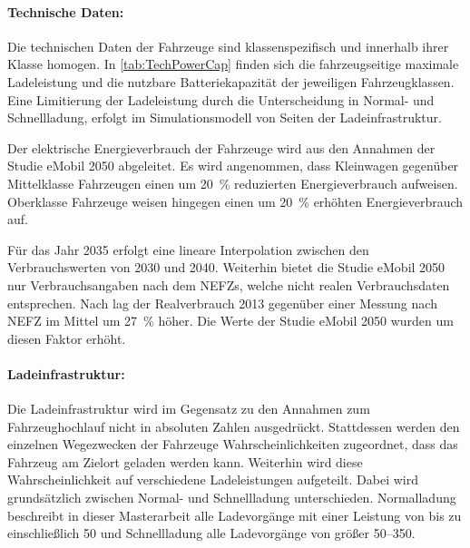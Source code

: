 \paragraph{Technische Daten:}

Die technischen Daten der Fahrzeuge sind klassenspezifisch und innerhalb ihrer Klasse homogen.
In \autoref{tab:TechPowerCap} finden sich die fahrzeugseitige maximale Ladeleistung und die nutzbare Batteriekapazität der jeweiligen Fahrzeugklassen.
Eine Limitierung der Ladeleistung durch die Unterscheidung in Normal- und Schnellladung, erfolgt im Simulationsmodell von Seiten der Ladeinfrastruktur.



Der elektrische Energieverbrauch der Fahrzeuge wird aus den Annahmen der Studie \glqq eMobil \num{2050}\grqq{} \cite{Hacker2014} abgeleitet.
Es wird angenommen, dass Kleinwagen gegenüber Mittelklasse Fahrzeugen einen um \SI{20}{\percent} reduzierten Energieverbrauch aufweisen.
Oberklasse Fahrzeuge weisen hingegen einen um \SI{20}{\percent} erhöhten Energieverbrauch auf.\medskip

Für das Jahr \num{2035} erfolgt eine lineare Interpolation zwischen den Verbrauchswerten von \num{2030} und \num{2040}.
Weiterhin bietet die Studie \glqq eMobil \num{2050}\grqq{} nur Verbrauchsangaben nach dem \glspl{NEFZ}, welche nicht realen Verbrauchsdaten entsprechen.
Nach \cite{Heinfellner2015} lag der Realverbrauch \num{2013} gegenüber einer Messung nach \gls{NEFZ} im Mittel um \SI{27}{\percent} höher.
Die Werte der Studie \glqq eMobil \num{2050}\grqq{} wurden um diesen Faktor erhöht.



\paragraph{Ladeinfrastruktur:}

Die Ladeinfrastruktur wird im Gegensatz zu den Annahmen zum Fahrzeughochlauf nicht in absoluten Zahlen ausgedrückt.
Stattdessen werden den einzelnen Wegezwecken der Fahrzeuge Wahrscheinlichkeiten zugeordnet, dass das Fahrzeug am Zielort geladen werden kann.
Weiterhin wird diese Wahrscheinlichkeit auf verschiedene Ladeleistungen aufgeteilt.
Dabei wird grundsätzlich zwischen Normal- und Schnellladung unterschieden.
Normalladung beschreibt in dieser Masterarbeit alle Ladevorgänge mit einer Leistung von bis zu einschließlich \SI{50}{\kw} und Schnellladung alle Ladevorgänge von größer \SIrange[range-phrase=~bis~einschließlich~]{50}{350}{\kw}.


